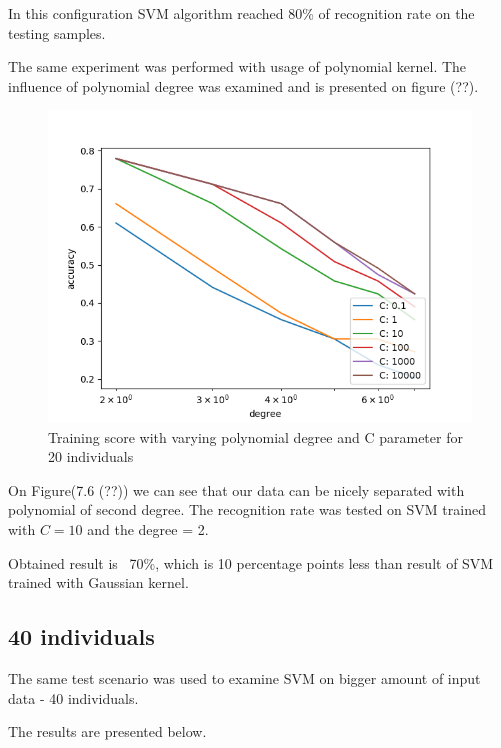 In this configuration SVM algorithm reached 80\% of recognition rate on the testing samples.

The same experiment was performed with usage of polynomial kernel. 
The influence of polynomial degree was examined and is presented on figure (??).

\begin{figure}[H]
\centering
\includegraphics[scale=0.75]{img/svm/better_graphs/CFD_20i_poly.png}
\caption{Training score with varying polynomial degree and C parameter for 20 individuals}
\end{figure} 

On Figure(7.6 (??)) we can see that our data can be nicely separated with polynomial of second degree.  
The recognition rate was tested on SVM trained with $C = 10$ and the degree = 2.

Obtained result is ~70\%, which is 10 percentage points less than result of SVM trained with Gaussian kernel. 

\subsection{40 individuals}

The same test scenario was used to examine SVM on bigger amount of input data - 40 individuals.

The results are presented below.


